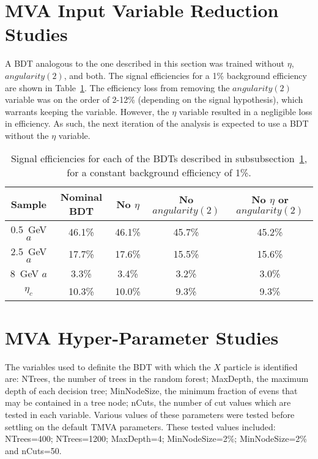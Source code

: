 \documentclass[NOTE, atlasdraft=true, texlive=2017, UKenglish]{\ATLASLATEXPATH atlasdoc}
\begin{document}
\clearpage
\section{MVA Input Variable Reduction Studies}
\label{app:mvavarreductionstudies}


A BDT analogous to the one described in this section was trained without $\eta$, $angularity(2)$, and both. The signal efficiencies for a 1\% background efficiency are shown in Table~\ref{tab:altbdtvars}. The efficiency loss from removing the $angularity(2)$ variable was on the order of 2-12\% (depending on the signal hypothesis), which warrants keeping the variable. However, the $\eta$ variable resulted in a negligible loss in efficiency. As such, the next iteration of the analysis is expected to use a BDT without the $\eta$ variable.

\begin{table}[!htbp]{\footnotesize\renewcommand{\arraystretch}{1.2}
    \begin{center}
      \begin{tabular}{|c|c|c|c|c|}
        \hline
        Sample & Nominal BDT & No $\eta$ & No $angularity(2)$ & No $\eta$ or $angularity(2)$ \\
        \hline
        0.5~GeV $a$ & 46.1\% & 46.1\% & 45.7\% & 45.2\%\\
        2.5~GeV $a$ & 17.7\% & 17.6\% & 15.5\% & 15.6\%\\
        8~GeV $a$ & 3.3\% & 3.4\% & 3.2\% & 3.0\%\\
        $\eta_c$ & 10.3\% & 10.0\% & 9.3\% & 9.3\%\\
        \hline
      \end{tabular}
      \caption{Signal efficiencies for each of the BDTs described in subsubsection~\ref{app:mvavarreductionstudies}, for a constant background efficiency of 1\%.}
      \label{tab:altbdtvars}
  \end{center}}
\end{table}


\clearpage
\section{MVA Hyper-Parameter Studies}
\label{app:bdthyperparameters}

The variables used to definite the BDT with which the $X$ particle is identified are: NTrees, the number of trees in the random forest; MaxDepth, the maximum depth of each decision tree; MinNodeSize, the minimum fraction of evens that may be contained in a tree node; nCuts, the number of cut values which are tested in each variable. Various values of these parameters were tested before settling on the default \textsc{TMVA} parameters. These tested values included: NTrees=400; NTrees=1200; MaxDepth=4; MinNodeSize=2\%; MinNodeSize=2\% and nCuts=50.
\end{document}
